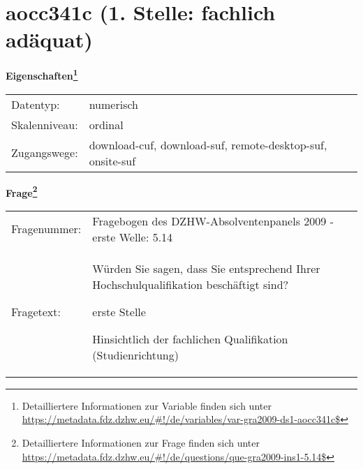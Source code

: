
    \setcounter{footnote}{0}

    \vspace*{-1.8cm}
	\section{aocc341c (1. Stelle: fachlich adäquat)}
	\label{section:aocc341c}



    \vspace*{0.5cm}
    \noindent\textbf{Eigenschaften\footnote{Detailliertere Informationen zur Variable finden sich unter
		\url{https://metadata.fdz.dzhw.eu/\#!/de/variables/var-gra2009-ds1-aocc341c$}}}\\
	\begin{tabularx}{\hsize}{@{}lX}
	Datentyp: & numerisch \\
	Skalenniveau: & ordinal \\
	Zugangswege: &
	  download-cuf, 
	  download-suf, 
	  remote-desktop-suf, 
	  onsite-suf
 \\
    \end{tabularx}



				\vspace*{0.5cm}
                \noindent\textbf{Frage\footnote{Detailliertere Informationen zur Frage finden sich unter
		              \url{https://metadata.fdz.dzhw.eu/\#!/de/questions/que-gra2009-ins1-5.14$}}}\\
				\begin{tabularx}{\hsize}{@{}lX}
					Fragenummer: &
					  Fragebogen des DZHW-Absolventenpanels 2009 - erste Welle:
					  5.14
 \\
					Fragetext: & Würden Sie sagen, dass Sie entsprechend Ihrer Hochschulqualifikation beschäftigt sind?\par  erste Stelle\par  Hinsichtlich der fachlichen Qualifikation (Studienrichtung) \\
				\end{tabularx}





